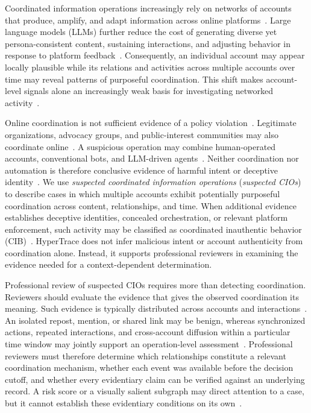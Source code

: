 Coordinated information operations increasingly rely on networks of accounts that produce, amplify, and adapt information across online platforms~\cite{cima2024coordinated,graham2024toolkit,minici2024crossplatform}. Large language models (LLMs) further reduce the cost of generating diverse yet persona-consistent content, sustaining interactions, and adjusting behavior in response to platform feedback~\cite{piao2025social,jin2025synthetic}. Consequently, an individual account may appear locally plausible while its relations and activities across multiple accounts over time may reveal patterns of purposeful coordination. This shift makes account-level signals alone an increasingly weak basis for investigating networked activity~\cite{cima2024coordinated,zouzou2024fakefollowers,burghardt2024sociolinguistic}. 

Online coordination is not sufficient evidence of a policy violation~\cite{graham2024toolkit,rogers2025manufactured}. Legitimate organizations, advocacy groups, and public-interest communities may also coordinate online~\cite{graham2024toolkit}. A suspicious operation may combine human-operated accounts, conventional bots, and LLM-driven agents~\cite{zouzou2024fakefollowers,burghardt2024sociolinguistic,piao2025social,jin2025synthetic}. Neither coordination nor automation is therefore conclusive evidence of harmful intent or deceptive identity~\cite{rogers2025manufactured}. We use \emph{suspected coordinated information operations} (\emph{suspected CIOs}) to describe cases in which multiple accounts exhibit potentially purposeful coordination across content, relationships, and time. When additional evidence establishes deceptive identities, concealed orchestration, or relevant platform enforcement, such activity may be classified as coordinated inauthentic behavior (CIB)~\cite{rogers2025manufactured,luceri2026tiktok}. HyperTrace does not infer malicious intent or account authenticity from coordination alone. Instead, it supports professional reviewers in examining the evidence needed for a context-dependent determination.

Professional review of suspected CIOs requires more than detecting coordination. Reviewers should evaluate the evidence that gives the observed coordination its meaning. Such evidence is typically distributed across accounts and interactions~\cite{cima2024coordinated,graham2024toolkit,minici2024crossplatform}. An isolated repost, mention, or shared link may be benign, whereas synchronized actions, repeated interactions, and cross-account diffusion within a particular time window may jointly support an operation-level assessment~\cite{cima2024coordinated,graham2024toolkit,zouzou2024fakefollowers}. Professional reviewers must therefore determine which relationships constitute a relevant coordination mechanism, whether each event was available before the decision cutoff, and whether every evidentiary claim can be verified against an underlying record. %
A risk score or a visually salient subgraph may direct attention to a case, but it cannot establish these evidentiary conditions on its own~\cite{agarwal2023evaluating,schemmer2023appropriate}.

